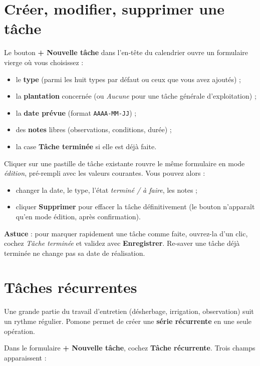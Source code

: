 \section{Créer, modifier, supprimer une tâche}

Le bouton \textbf{+ Nouvelle tâche} dans l'en-tête du calendrier ouvre un formulaire vierge où vous choisissez :

\begin{itemize}
  \item le \textbf{type} (parmi les huit types par défaut ou ceux que vous avez ajoutés) ;
  \item la \textbf{plantation} concernée (ou \emph{Aucune} pour une tâche générale d'exploitation) ;
  \item la \textbf{date prévue} (format \texttt{AAAA-MM-JJ}) ;
  \item des \textbf{notes} libres (observations, conditions, durée) ;
  \item la case \textbf{Tâche terminée} si elle est déjà faite.
\end{itemize}

Cliquer sur une pastille de tâche existante rouvre le même formulaire en mode \emph{édition}, pré-rempli avec les valeurs courantes. Vous pouvez alors :

\begin{itemize}
  \item changer la date, le type, l'état \emph{terminé / à faire}, les notes ;
  \item cliquer \textbf{Supprimer} pour effacer la tâche définitivement (le bouton n'apparaît qu'en mode édition, après confirmation).
\end{itemize}

\textbf{Astuce} : pour marquer rapidement une tâche comme faite, ouvrez-la d'un clic, cochez \emph{Tâche terminée} et validez avec \textbf{Enregistrer}. Re-saver une tâche déjà terminée ne change pas sa date de réalisation.

\section{Tâches récurrentes}

Une grande partie du travail d'entretien (désherbage, irrigation, observation) suit un rythme régulier. Pomone permet de créer une \textbf{série récurrente} en une seule opération.

Dans le formulaire \textbf{+ Nouvelle tâche}, cochez \textbf{Tâche récurrente}. Trois champs apparaissent :

